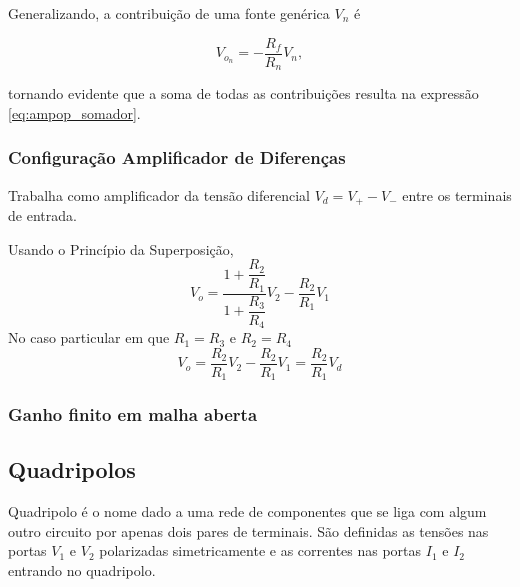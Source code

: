 \documentclass{article}
\numberwithin{equation}{section}
\let\dfr\dfrac
\begin{document}
Generalizando, a contribuição de uma fonte genérica $V_n$ é

\begin{equation}
    V_{o_n} = - \dfr{R_f}{R_n}V_n,
\end{equation}

\noindent tornando evidente que a soma de todas as contribuições resulta na expressão \eqref{eq:ampop_somador}.

\subsubsection{Configuração Amplificador de Diferenças}
Trabalha como amplificador da tensão diferencial $V_{d}=V_{+}-V_{-}$ entre os terminais de entrada.

\begin{center}
\end{center}

Usando o Princípio da Superposição,
\begin{equation*}
    V_{o}=\frac{1+\dfr{R_{2}}{R_{1}}}{1+\dfr{R_{3}}{R_{4}}}V_{2} - \dfr{R_{2}}{R_{1}}V_{1}
\end{equation*}
No caso particular em que $R_{1}=R_{3}$ e $R_{2}=R_{4}$
\begin{equation}
    V_{o}=\frac{R_{2}}{R_{1}}V_{2}-\frac{R_{2}}{R_{1}}V_{1}=\frac{R_{2}}{R_{1}}V_{d}
\end{equation}

\subsubsection{Ganho finito em malha aberta}
\label{subsubsec:ganho finito}

\subsection{Quadripolos}
\label{subsec:quadripolos}
Quadripolo é o nome dado a uma rede de componentes que se liga com algum outro circuito por apenas dois pares de terminais. São definidas as tensões nas portas $V_{1}$ e $V_{2}$ polarizadas simetricamente e as correntes nas portas $I_{1}$ e $I_{2}$ entrando no quadripolo.
\end{document}

